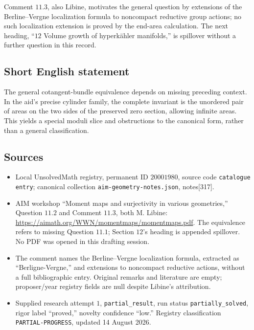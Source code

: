 \documentclass[11pt]{article}
\begin{document}
Comment \(11.3\), also Libine, motivates the general question by extensions of the Berline--Vergne localization formula to noncompact reductive group actions; no such localization extension is proved by the end-area calculation. The next heading, ``\(12\) Volume growth of hyperk\"ahler manifolds,'' is spillover without a further question in this record.
\subsection{Short English statement}
The general cotangent-bundle equivalence depends on missing preceding context. In the aid's precise cylinder family, the complete invariant is the unordered pair of areas on the two sides of the preserved zero section, allowing infinite areas. This yields a special moduli slice and obstructions to the canonical form, rather than a general classification.
\subsection{Sources}
\begin{itemize}
\item Local UnsolvedMath registry, permanent ID \(20001980\), source code \texttt{catalogue entry}; canonical collection \texttt{aim-geometry-notes.json}, notes[317].
\item AIM workshop ``Moment maps and surjectivity in various geometries,'' Question \(11.2\) and Comment \(11.3\), both M. Libine: \url{https://aimath.org/WWN/momentmaps/momentmaps.pdf}. The equivalence refers to missing Question \(11.1\); Section \(12\)'s heading is appended spillover. No PDF was opened in this drafting session.
\item The comment names the Berline--Vergne localization formula, extracted as ``Berligne-Vergne,'' and extensions to noncompact reductive actions, without a full bibliographic entry. Original remarks and literature are empty; proposer/year registry fields are null despite Libine's attribution.
\item Supplied research attempt \(1\), \texttt{partial\_result}, run status \texttt{partially\_solved}, rigor label ``proved,'' novelty confidence ``low.'' Registry classification \texttt{PARTIAL-PROGRESS}, updated 14 August 2026.
\end{itemize}
\end{document}
